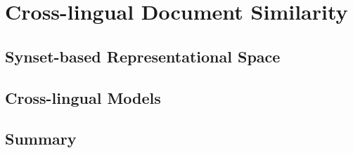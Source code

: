

\chapter{Cross-lingual Document Similarity}\label{ch:multilinguality}

\graphicspath{{multilinguality/figures/}}



\section{Synset-based Representational Space}

\section{Cross-lingual Models}

\section{Summary}